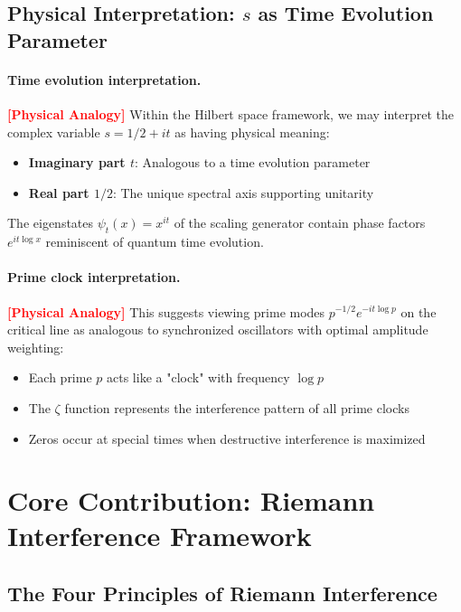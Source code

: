 \documentclass[12pt]{article}
\theoremstyle{plain}
\theoremstyle{definition}
\newcommand{\statusanalogy}{\textcolor{red}{\textbf{[Physical Analogy]}}}
\begin{document}
\subsection{Physical Interpretation: $s$ as Time Evolution Parameter}

\paragraph{Time evolution interpretation.} \statusanalogy
Within the Hilbert space framework, we may interpret the complex variable $s = 1/2 + it$ as having physical meaning:
\begin{itemize}
\item \textbf{Imaginary part $t$}: Analogous to a time evolution parameter
\item \textbf{Real part $1/2$}: The unique spectral axis supporting unitarity
\end{itemize}

The eigenstates $\psi_t(x) = x^{it}$ of the scaling generator contain phase factors $e^{it\log x}$ reminiscent of quantum time evolution.

\paragraph{Prime clock interpretation.} \statusanalogy 
This suggests viewing prime modes $p^{-1/2}e^{-it\log p}$ on the critical line as analogous to synchronized oscillators with optimal amplitude weighting:
\begin{itemize}
\item Each prime $p$ acts like a "clock" with frequency $\log p$
\item The $\zeta$ function represents the interference pattern of all prime clocks
\item Zeros occur at special times when destructive interference is maximized
\end{itemize}





\section{Core Contribution: Riemann Interference Framework}

\subsection{The Four Principles of Riemann Interference}
\end{document}
